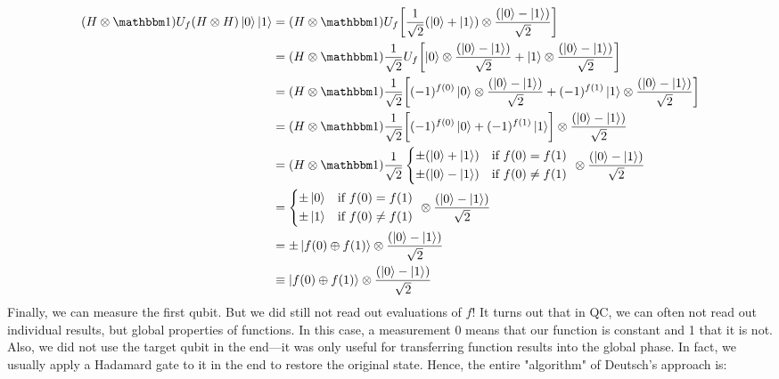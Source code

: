 			\begin{align}
				(H \otimes \ID) U_f (H \otimes H) \ket{0}\ket{1}
				 & = (H \otimes \ID) U_f \biggl[ \frac{1}{\sqrt{2}} (\ket{0} + \ket{1}) \otimes \frac{(\ket{0} - \ket{1})}{\sqrt{2}} \biggr]                                                                \\
				 & = (H \otimes \ID) \frac{1}{\sqrt{2}} U_f \biggl[ \ket{0} \otimes \frac{(\ket{0} - \ket{1})}{\sqrt{2}} + \ket{1} \otimes \frac{(\ket{0} - \ket{1})}{\sqrt{2}} \biggr]                     \\
				 & = (H \otimes \ID) \frac{1}{\sqrt{2}} \biggl[ (-1)^{f(0)} \ket{0} \otimes \frac{(\ket{0} - \ket{1})}{\sqrt{2}} + (-1)^{f(1)} \ket{1} \otimes \frac{(\ket{0} - \ket{1})}{\sqrt{2}} \biggr] \\
				 & = (H \otimes \ID) \frac{1}{\sqrt{2}} \biggl[ (-1)^{f(0)} \ket{0} + (-1)^{f(1)} \ket{1} \biggr] \otimes \frac{(\ket{0} - \ket{1})}{\sqrt{2}}                                              \\
				 & = (H \otimes \ID) \frac{1}{\sqrt{2}}
				\begin{cases*}
					\pm (\ket{0} + \ket{1}) & if \( f(0) = f(1) \)    \\
					\pm (\ket{0} - \ket{1}) & if \( f(0) \neq f(1) \)
				\end{cases*}
				\otimes \frac{(\ket{0} - \ket{1})}{\sqrt{2}}                                                                                                                                                \\
				 & =
				\begin{cases*}
					\pm \ket{0} & if \( f(0) = f(1) \)    \\
					\pm \ket{1} & if \( f(0) \neq f(1) \)
				\end{cases*}
				\otimes \frac{(\ket{0} - \ket{1})}{\sqrt{2}}                                                                                                                                                \\
				 & = \pm \ket{f(0) \oplus f(1)} \otimes \frac{(\ket{0} - \ket{1})}{\sqrt{2}}                                                                                                                \\
				 & \equiv \ket{f(0) \oplus f(1)} \otimes \frac{(\ket{0} - \ket{1})}{\sqrt{2}}
			\end{align}
			Finally, we can measure the first qubit. But we did still not read out evaluations of \(f\)! It turns out that in \ac{QC}, we can often not read out individual results, but global properties of functions. In this case, a measurement \num{0} means that our function is constant and \num{1} that it is not. Also, we did not use the target qubit in the end---it was only useful for transferring function results into the global phase. In fact, we usually apply a Hadamard gate to it in the end to restore the original state. Hence, the entire "algorithm" of Deutsch's approach is:
